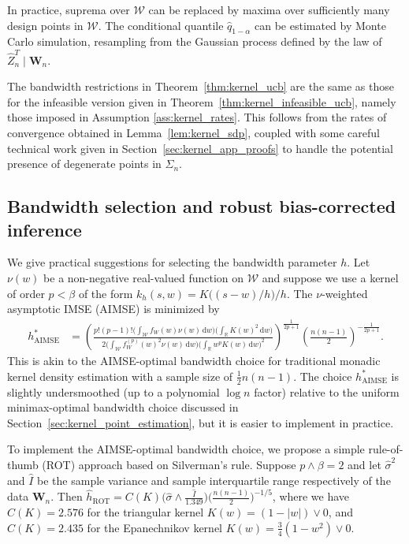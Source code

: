 \documentclass[11pt,lof]{puthesis}
\newcommand{\R}{\ensuremath{\mathbb{R}}}
\newcommand{\bW}{\ensuremath{\mathbf{W}}}
\newcommand{\cW}{\ensuremath{\mathcal{W}}}
\DeclareMathOperator{\AIMSE}{AIMSE}
\DeclareMathOperator{\ROT}{ROT}
\newcommand{\diff}[1]{\,\mathrm{d}#1}
\theoremstyle{break}
\theoremstyle{proof}
\begin{document}
In practice, suprema over $\cW$ can be replaced by maxima over sufficiently
many design points in $\cW$. The conditional quantile $\hat q_{1-\alpha}$ can
be estimated by Monte Carlo simulation, resampling from the Gaussian process
defined by the law of $\hat Z_n^T \mid \bW_n$.

The bandwidth restrictions in Theorem~\ref{thm:kernel_ucb} are the same as
those for the infeasible version given in
Theorem~\ref{thm:kernel_infeasible_ucb},
namely those imposed in Assumption \ref{ass:kernel_rates}. This follows from
the rates
of convergence obtained in Lemma~\ref{lem:kernel_sdp}, coupled with some careful
technical work given in Section~\ref{sec:kernel_app_proofs} to handle the
potential presence of degenerate points in $\Sigma_n$.

\subsection{Bandwidth selection and robust bias-corrected inference}
\label{sec:kernel_bandwidth_selection}

We give practical suggestions for selecting the bandwidth parameter $h$.
Let $\nu(w)$ be a non-negative real-valued function on $\cW$ and suppose we use
a kernel of order $p < \beta$ of the form $k_h(s,w) = K\big((s-w) / h\big)/h$.
The $\nu$-weighted asymptotic IMSE (AIMSE) is minimized by
%
\begin{align*}
  h^*_{\AIMSE}
  &=
  \left(
    \frac{p!(p-1)!
      \Big(\int_\cW f_W(w) \nu(w) \diff{w}\Big)
    \Big(\int_\R K(w)^2 \diff{w}\Big)}
    {2 \Big(
        \int_{\cW}
        f_W^{(p)}(w)^2
        \nu(w)
        \diff{w}
      \Big)
      \Big(
        \int_\R
        w^p K(w)
        \diff{w}
      \Big)^2
    }
  \right)^{\frac{1}{2p+1}}
  \left( \frac{n(n-1)}{2} \right)^{-\frac{1}{2p+1}}.
\end{align*}
%
This is akin to the AIMSE-optimal bandwidth choice for traditional monadic
kernel density estimation with a sample size of $\frac{1}{2}n(n-1)$. The choice
$h^*_{\AIMSE}$ is slightly undersmoothed (up to a polynomial $\log n$ factor)
relative to the uniform minimax-optimal bandwidth choice discussed in
Section~\ref{sec:kernel_point_estimation}, but it is easier to implement in
practice.

To implement the AIMSE-optimal bandwidth choice, we propose a simple
rule-of-thumb (ROT) approach based on Silverman's rule.
Suppose $p\wedge\beta=2$ and let $\hat\sigma^2$ and $\hat I$
be the sample variance and sample interquartile range respectively
of the data $\bW_n$. Then
$\hat{h}_{\ROT} = C(K) \big( \hat\sigma \wedge
\frac{\hat I}{1.349} \big) \big(\frac{n(n-1)}{2} \big)^{-1/5}$,
where we have $C(K)=2.576$ for the triangular kernel $K(w) = (1 - |w|) \vee 0$,
and $C(K)=2.435$ for the Epanechnikov kernel
$K(w) = \frac{3}{4}(1 - w^2) \vee 0$.
\end{document}

